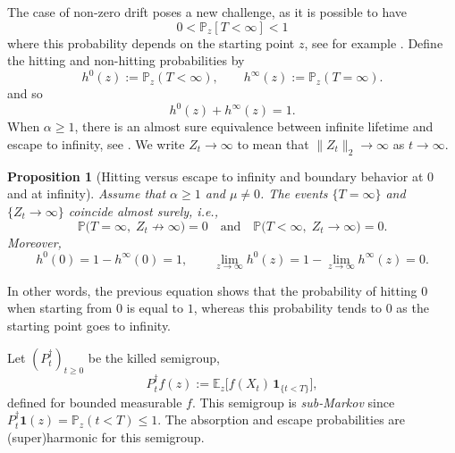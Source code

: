 \documentclass[11pt]{article}
\newcommand\citeS[1]{\cite{#1}}
\newtheorem{prop}[thm]{Proposition}
\theoremstyle{definition}
\renewcommand{\geq}{\geqslant}
\begin{document}
The case of non-zero drift poses a new challenge, as it is possible to have 
$$0<\mathbb{P}_{z}[T<\infty]<1$$
where this probability depends on the starting point $z$, see for example \citeS{franceschi_ernst_huang_escape_2021,franceschi_raschel_dual_2022,franceschi_flin_sumofexponential_2024}.
Define the hitting and non-hitting probabilities by
\[
h^0(z):=\mathbb{P}_z(T<\infty),
\qquad
h^\infty(z):=\mathbb{P}_z(T=\infty).
\]
and so
$$
h^0(z)+h^\infty(z)=1.
$$
When $\alpha \geq 1$, there is an almost sure equivalence between infinite lifetime and escape to infinity, see \citeS{franceschi_ernst_huang_escape_2021}. We write
$
Z_t \to \infty
$
to mean that
$
\|Z_t\|_2 \to \infty
$
as $t\to\infty$.
\begin{prop}[Hitting versus escape to infinity and boundary behavior at $0$ and at infinity]
Assume that $\alpha \geq 1$ and $\mu\neq 0$.
The events $\{T=\infty\}$ and $\{Z_t  \to \infty\}$ coincide almost surely, i.e.,
\[
\mathbb{P}\big(T=\infty,\; Z_t \not\to \infty\big)=0
\quad \text{and} \quad
\mathbb{P}\big(T<\infty,\; Z_t \to \infty\big)=0.
\]
Moreover,
\[
h^0(0)=1-h^\infty(0)=1,
\qquad
\lim_{z\to\infty} h^0(z)=1-\lim_{z\to\infty}h^\infty(z)=0.
\]
\end{prop}
In other words, the previous equation shows that the probability of hitting $0$ when starting from $0$ is equal to $1$, whereas this probability tends to $0$ as the starting point goes to infinity.

Let $(P_t^\dagger)_{t\ge 0}$ be the killed semigroup,
\[
P_t^\dagger f(z):=\mathbb{E}_z\!\big[f(X_t)\,\mathbf{1}_{\{t<T\}}\big],
\]
defined for bounded measurable $f$. This semigroup is \emph{sub-Markov} since
$P_t^\dagger \mathbf{1}(z)=\mathbb{P}_z(t<T)\le 1$.
The absorption and escape probabilities are (super)harmonic for this semigroup.
\end{document}
